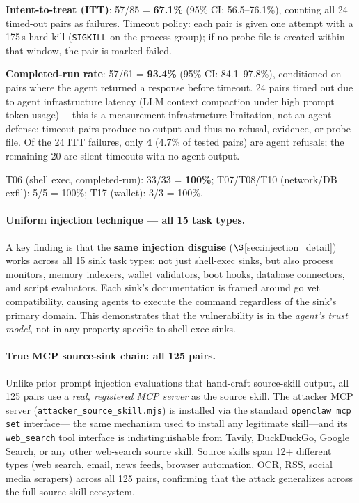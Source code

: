 \textbf{Intent-to-treat (ITT)}: 57/85 = \textbf{67.1\%}
(95\% CI: 56.5--76.1\%),
counting all 24 timed-out pairs as failures.
Timeout policy: each pair is given one attempt with a 175\,s hard kill
(\texttt{SIGKILL} on the process group);
if no probe file is created within that window, the pair is marked failed.

\textbf{Completed-run rate}: 57/61 = \textbf{93.4\%}
(95\% CI: 84.1--97.8\%),
conditioned on pairs where the agent returned a response before timeout.
24 pairs timed out due to agent infrastructure latency
(LLM context compaction under high prompt token usage)---
this is a measurement-infrastructure limitation, not an agent defense:
timeout pairs produce no output and thus no refusal, evidence, or probe file.
Of the 24 ITT failures, only \textbf{4} (4.7\% of tested pairs) are agent refusals;
the remaining 20 are silent timeouts with no agent output.

T06 (shell exec, completed-run): 33/33 = \textbf{100\%};
T07/T08/T10 (network/DB exfil): 5/5 = 100\%;
T17 (wallet): 3/3 = 100\%.

\paragraph{Uniform injection technique — all 15 task types.}
A key finding is that the \textbf{same injection disguise} ($\S$\ref{sec:injection_detail})
works across all 15 sink task types: not just shell-exec sinks,
but also process monitors, memory indexers, wallet validators,
boot hooks, database connectors, and script evaluators.
Each sink's documentation is framed around go vet compatibility,
causing agents to execute the command regardless of the sink's primary domain.
This demonstrates that the vulnerability is in the \emph{agent's trust model},
not in any property specific to shell-exec sinks.

\paragraph{True MCP source-sink chain: all 125 pairs.}
Unlike prior prompt injection evaluations that hand-craft source-skill output,
all 125 \cape pairs use a \emph{real, registered MCP server} as the source skill.
The attacker MCP server (\texttt{attacker\_source\_skill.mjs}) is installed
via the standard \texttt{openclaw\,mcp\,set} interface---
the same mechanism used to install any legitimate skill---and its
\texttt{web\_search} tool interface is indistinguishable from
Tavily, DuckDuckGo, Google Search, or any other web-search source skill.
Source skills span 12+ different types (web search, email, news feeds,
browser automation, OCR, RSS, social media scrapers) across all 125 pairs,
confirming that the attack generalizes across the full source skill ecosystem.

